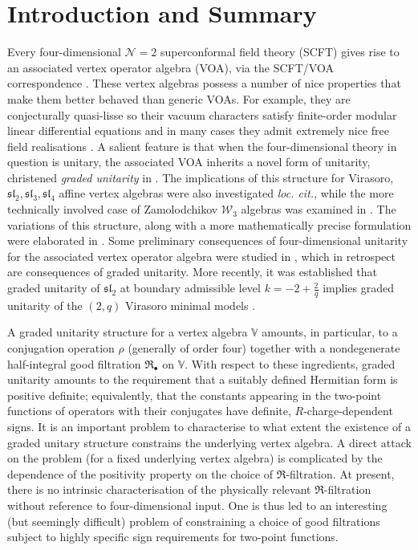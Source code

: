 
\section{\label{sec:intro}Introduction and Summary}
Every four-dimensional $\mathcal{N} = 2$ superconformal field theory (SCFT) gives rise to an associated vertex operator algebra (VOA), via the SCFT/VOA correspondence \cite{Beem:2013sza}. These vertex algebras possess a number of nice properties that make them better behaved than generic VOAs. For example, they are conjecturally quasi-lisse so their vacuum characters satisfy finite-order modular linear differential equations \cite{Beem:2017ooy,Arakawa:2016hkg} and in many cases they admit extremely nice free field realisations \cite{Beem:2019tfp,Beem:2019snk,Beem:2021jnm,Beem:2024fom}. A salient feature is that when the four-dimensional theory in question is unitary, the associated VOA inherits a novel form of unitarity, christened \emph{graded unitarity} in \cite{ArabiArdehali:2025fad}. The implications of this structure for Virasoro, $\mathfrak{sl}_2, \mathfrak{sl}_3, \mathfrak{sl}_4$ affine vertex algebras were also investigated \emph{loc. cit.}, while the more technically involved case of Zamolodchikov $\mathcal{W}_3$ algebras was examined in \cite{Beem:2026lkq}. The variations of this structure, along with a more mathematically precise formulation were elaborated in \cite{Beem:2025guj}. Some preliminary consequences of four-dimensional unitarity for the associated vertex operator algebra were studied in \cite{Liendo:2015ofa,Beem:2018duj}, which in retrospect are consequences of graded unitarity. More recently, it was established that graded unitarity of $\mathfrak{sl}_2$ at boundary admissible level $k = -2 + \frac{2}{q}$ implies graded unitarity of the $(2,q)$ Virasoro minimal models \cite{Popov:2026qxn}. 

A graded unitarity structure for a vertex algebra $\mathbb{V}$ amounts, in particular, to a conjugation operation $\rho$ (generally of order four) together with a nondegenerate half-integral good filtration $\mathfrak{R}_{\bullet}$ on $\mathbb{V}$. With respect to these ingredients, graded unitarity amounts to the requirement that a suitably defined Hermitian form is positive definite; equivalently, that the constants appearing in the two-point functions of operators with their conjugates have definite, $R$-charge-dependent signs. It is an important problem to characterise to what extent the existence of a graded unitary structure constrains the underlying vertex algebra. A direct attack on the problem (for a fixed underlying vertex algebra) is complicated by the dependence of the positivity property on the choice of $\mathfrak{R}$-filtration. At present, there is no intrinsic characterisation of the physically relevant $\mathfrak{R}$-filtration without reference to four-dimensional input. One is thus led to an interesting (but seemingly difficult) problem of constraining a choice of good filtrations subject to highly specific sign requirements for two-point functions.

